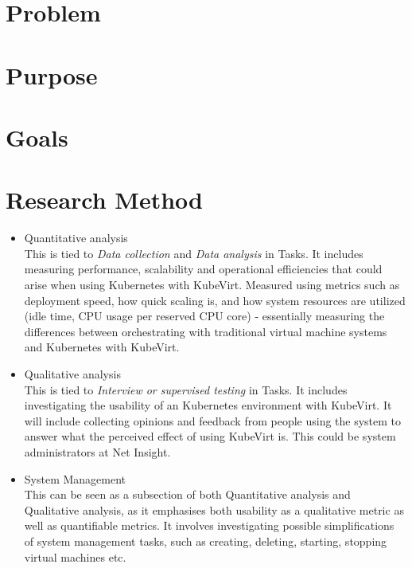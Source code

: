 \documentclass{kththesis}
\begin{document}
\section{Problem}

\section{Purpose}

\section{Goals}

\section{Research Method}
\begin{itemize}
  \item Quantitative analysis\\
  This is tied to \textit{Data collection} and \textit{Data analysis} in Tasks. It includes measuring performance, scalability and operational efficiencies that could arise when using Kubernetes with KubeVirt. Measured using metrics such as deployment speed, how quick scaling is, and how system resources are utilized (idle time, CPU usage per reserved CPU core) - essentially measuring the differences between orchestrating with traditional virtual machine systems and Kubernetes with KubeVirt. 
  \item Qualitative analysis\\
  This is tied to \textit{Interview or supervised testing} in Tasks. It includes investigating the usability of an Kubernetes environment with KubeVirt. It will include collecting opinions and feedback from people using the system to answer what the perceived effect of using KubeVirt is. This could be system administrators at Net Insight.
  \item System Management\\
  This can be seen as a subsection of both Quantitative analysis and Qualitative analysis, as it emphasises both usability as a qualitative metric as well as quantifiable metrics. It involves investigating possible simplifications of system management tasks, such as creating, deleting, starting, stopping virtual machines etc.
\end{itemize}
\end{document}
